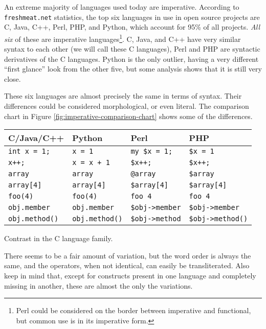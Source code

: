 \documentclass[12pt]{article}
\begin{document}
An extreme majority of languages used today are imperative.  According
to \texttt{freshmeat.net} statistics\cite{Welton-2004}, the top six
languages in use in open source projects are C, Java, C++, Perl, PHP,
and Python, which account for 95\% of all projects.  \textit{All six} of
these are imperative languages\footnote{Perl could be considered on the
border between imperative and functional, but common use is in its
imperative form.}.  C, Java, and C++ have very similar syntax to each
other (we will call these C languages), Perl and PHP are syntactic
derivatives of the C languages.  Python is the only outlier, having a
very different ``first glance'' look from the other five, but some
analysis shows that it is still very close.

These six languages are almost precisely the same in terms of syntax.
Their differences could be considered morphological, or even literal.
The comparison chart in Figure \ref{fig:imperative-comparison-chart}
shows some of the differences.

\begin{Figure}
\label{fig:imperative-comparison-chart}
\begin{tabular}{l|l|l|l}
\textbf{C/Java/C++} & \textbf{Python} & \textbf{Perl}     & \textbf{PHP} \\
\hline
\verb+int x = 1;+   & \verb+x = 1+        & \verb+my $x = 1;+   & \verb+$x = 1+     \\
\verb|x++;|         & \verb|x = x + 1|    & \verb|$x++;|        & \verb|$x++;|      \\
\verb+array+		& \verb+array+        & \verb+@array+		& \verb+$array+     \\
\verb+array[4]+		& \verb+array[4]+     & \verb+$array[4]+    & \verb+$array[4]+  \\
\verb+foo(4)+       & \verb+foo(4)+       & \verb+foo 4+        & \verb+foo 4+      \\
\verb+obj.member+   & \verb+obj.member+   & \verb+$obj->member+ & \verb+$obj->member+ \\
\verb+obj.method()+ & \verb+obj.method()+ & \verb+$obj->method+ & \verb+$obj->method()+ \\
\end{tabular}
\caption{Contrast in the C language family.}
\end{Figure}

There seems to be a fair amount of variation, but the word order is
always the same, and the operators, when not identical, can easily be
transliterated.  Also keep in mind that, except for constructs present
in one language and completely missing in another, these are almost the
only the variations.
\end{document}
